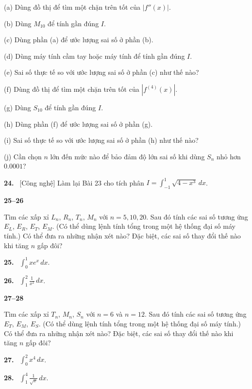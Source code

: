 \documentclass[12pt,a4paper]{article}
\newcommand{\bt}[1]{\par\smallskip\Needspace{5\baselineskip}\noindent\textbf{#1.}\ }
\newcommand{\group}[1]{\par\Needspace{11\baselineskip}\medskip\noindent\textbf{#1}\par\nopagebreak[4]}
\begin{document}
(a) Dùng đồ thị để tìm một chặn trên tốt của $|f''(x)|$.

(b) Dùng $M_{10}$ để tính gần đúng $I$.

(c) Dùng phần (a) để ước lượng sai số ở phần (b).

(d) Dùng máy tính cầm tay hoặc máy tính để tính gần đúng $I$.

(e) Sai số thực tế so với ước lượng sai số ở phần (c) như thế nào?

(f) Dùng đồ thị để tìm một chặn trên tốt của $|f^{(4)}(x)|$.

(g) Dùng $S_{10}$ để tính gần đúng $I$.

(h) Dùng phần (f) để ước lượng sai số ở phần (g).

(i) Sai số thực tế so với ước lượng sai số ở phần (h) như thế nào?

(j) Cần chọn $n$ lớn đến mức nào để bảo đảm độ lớn sai số khi dùng $S_n$ nhỏ hơn $0.0001$?

\bt{24} [Công nghệ] Làm lại Bài 23 cho tích phân $I=\int_{-1}^1\sqrt{4-x^3}\,dx$.

\group{25–26}
Tìm các xấp xỉ $L_n$, $R_n$, $T_n$, $M_n$ với $n=5,10,20$. Sau đó tính các sai số tương ứng $E_L$, $E_R$, $E_T$, $E_M$. (Có thể dùng lệnh tính tổng trong một hệ thống đại số máy tính.) Có thể đưa ra những nhận xét nào? Đặc biệt, các sai số thay đổi thế nào khi tăng $n$ gấp đôi?
\bt{25} $\displaystyle\int_0^1xe^x\,dx$.
\bt{26} $\displaystyle\int_1^2\frac1{x^2}\,dx$.

\group{27–28}
Tìm các xấp xỉ $T_n$, $M_n$, $S_n$ với $n=6$ và $n=12$. Sau đó tính các sai số tương ứng $E_T$, $E_M$, $E_S$. (Có thể dùng lệnh tính tổng trong một hệ thống đại số máy tính.) Có thể đưa ra những nhận xét nào? Đặc biệt, các sai số thay đổi thế nào khi tăng $n$ gấp đôi?
\bt{27} $\displaystyle\int_0^2x^4\,dx$.
\bt{28} $\displaystyle\int_1^4\frac1{\sqrt{x}}\,dx$.
\end{document}
